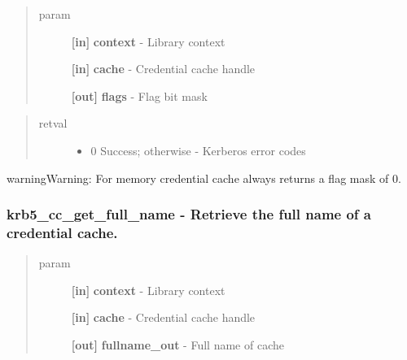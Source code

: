 \documentclass[letterpaper,10pt,english]{sphinxmanual}
\begin{document}
\begin{quote}\begin{description}
\item[{param}] \leavevmode
\textbf{{[}in{]}} \textbf{context} - Library context

\textbf{{[}in{]}} \textbf{cache} - Credential cache handle

\textbf{{[}out{]}} \textbf{flags} - Flag bit mask

\end{description}\end{quote}
\begin{quote}\begin{description}
\item[{retval}] \leavevmode\begin{itemize}
\item {} 
0   Success; otherwise - Kerberos error codes

\end{itemize}

\end{description}\end{quote}

\begin{notice}{warning}{Warning:}
For memory credential cache always returns a flag mask of 0.
\end{notice}


\subsubsection{krb5\_cc\_get\_full\_name -  Retrieve the full name of a credential cache.}
\label{appdev/refs/api/krb5_cc_get_full_name::doc}\label{appdev/refs/api/krb5_cc_get_full_name:krb5-cc-get-full-name-retrieve-the-full-name-of-a-credential-cache}

\begin{fulllineitems}
\label{appdev/refs/api/krb5_cc_get_full_name:krb5_cc_get_full_name}
\end{fulllineitems}

\begin{quote}\begin{description}
\item[{param}] \leavevmode
\textbf{{[}in{]}} \textbf{context} - Library context

\textbf{{[}in{]}} \textbf{cache} - Credential cache handle

\textbf{{[}out{]}} \textbf{fullname\_out} - Full name of cache

\end{description}\end{quote}
\end{document}
